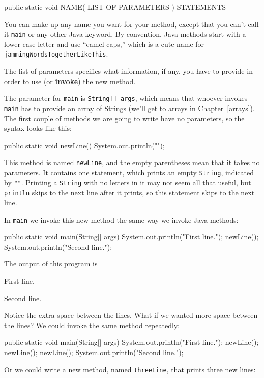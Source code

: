 \documentclass{book}
\begin{document}
\begin{verbatimtab}
  public static void NAME( LIST OF PARAMETERS ) {
    STATEMENTS
  }
\end{verbatimtab}
%
You can make up any name you want for your method, except
that you can't call it {\tt main} or any other
Java keyword.  By convention, Java methods start with a lower
case letter and use ``camel caps,'' which is a cute name for
{\tt jammingWordsTogetherLikeThis}.

The list of
parameters specifies what information, if any, you have to
provide in order to use (or {\bf invoke}) the new method.


The parameter for {\tt main} is {\tt String[] args}, which
means that whoever invokes {\tt main} has to provide an array of
Strings (we'll get to arrays in Chapter~\ref{arrays}).  The first
couple of methods we are going to write have no parameters, so the
syntax looks like this:

\begin{verbatimtab}
  public static void newLine() {
    System.out.println("");
  }
\end{verbatimtab}
%
This method is named {\tt newLine}, and the empty parentheses
mean that it takes no parameters.  It contains one
statement, which prints an empty {\tt String}, indicated by {\tt ""}.
Printing a {\tt String} with no letters in it may not seem all that
useful, but {\tt println} skips to the next
line after it prints, so this statement skips to the next line.

In {\tt main} we invoke this new method the same way we invoke 
Java methods:

\begin{verbatimtab}
  public static void main(String[] args) {
    System.out.println("First line.");
    newLine();
    System.out.println("Second line.");
  }
\end{verbatimtab}
%
The output of this program is

\begin{verbatimtab}
First line.

Second line.
\end{verbatimtab}
%
Notice the extra space between the lines.  What if we wanted
more space between the lines?  We could invoke the same
method repeatedly:

\begin{verbatimtab}
  public static void main(String[] args) {
    System.out.println("First line.");
    newLine();
    newLine();
    newLine();
    System.out.println("Second line.");
  }
\end{verbatimtab}
%
Or we could write a new method, named {\tt threeLine}, that 
prints three new lines:
\end{document}
